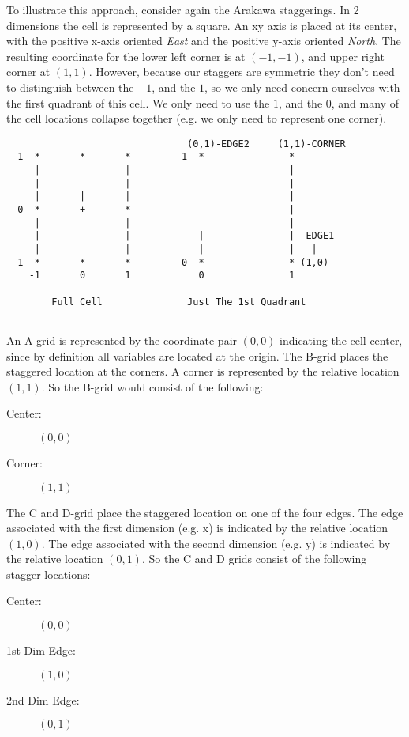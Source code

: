 To illustrate this approach, consider again the Arakawa staggerings. In 2 dimensions the cell is represented by a square. An xy axis is placed at its center, with the positive x-axis oriented {\em East} and the positive y-axis oriented {\em North}. The resulting coordinate for the lower left corner is at $(-1,-1)$, and upper right corner at $(1,1)$.
However, because our staggers are symmetric they don't need to distinguish between the $-1$, and the $1$, so
we only need concern ourselves with the first quadrant of this cell. We only need to use the $1$, and the $0$, and
many of the cell locations collapse together (e.g. we only need to represent one corner). 

\begin{verbatim}
                                (0,1)-EDGE2     (1,1)-CORNER
  1  *-------*-------*         1  *---------------* 
     |               |                            |
     |               |                            | 
     |       |       |                            | 
  0  *       +-      *                            |  
     |               |                            | 
     |               |            |               |  EDGE1
     |               |            |               |   |
 -1  *-------*-------*         0  *----           * (1,0)
    -1       0       1            0               1

        Full Cell               Just The 1st Quadrant
                                
\end{verbatim}


An A-grid is represented by the coordinate pair $(0,0)$ indicating the cell center, since by definition all variables are located at the origin. The B-grid places the staggered location at the corners. A corner is represented
by the relative location $(1,1)$. So the B-grid would consist of the following:
\begin{description}
\item [Center:] $(0,0)$
\item [Corner:] $(1,1)$
\end{description}

The C and D-grid place the staggered location on one of the four edges. The edge associated with the first dimension (e.g. x) is indicated by the relative location $(1,0)$. The edge associated with the second dimension (e.g. y) is indicated by the relative location $(0,1)$. So the C and D grids consist of the following stagger locations:
\begin{description}
\item [Center:] $(0,0)$
\item [1st Dim Edge:] $(1,0)$
\item [2nd Dim Edge:] $(0,1)$
\end{description}

